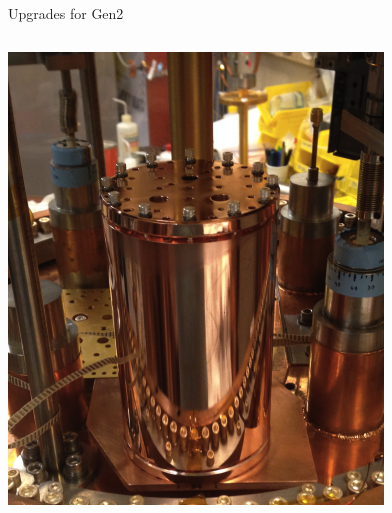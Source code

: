 \documentclass{beamer}
\begin{document}
\begin{frame}{Upgrades for Gen2}
\begin{columns}
\includegraphics[width=\textwidth]{sidecar_single}
\end{columns}

\end{frame}

%




%
\end{document}
